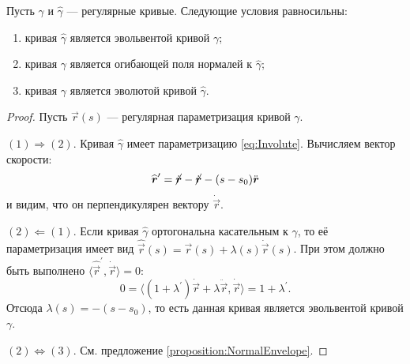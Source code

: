 \begin{theorem}
	Пусть $\gamma$ и $\widehat{\gamma}$ --- регулярные кривые. Следующие условия равносильны:
	\begin{enumerate}[nolistsep, label=(\arabic*)]
		\item кривая $\widehat{\gamma}$ является эвольвентой кривой $\gamma$;
		\item кривая $\gamma$ является огибающей поля нормалей к $\widehat{\gamma}$;
		\item кривая $\gamma$ является эволютой кривой $\widehat{\gamma}$.
	\end{enumerate}
\end{theorem}

\begin{proof}
	Пусть $\vec{r}(s)$ --- регулярная параметризация кривой $\gamma$.

	$(1) \Rightarrow (2)$. Кривая $\widehat{\gamma}$ имеет параметризацию \eqref{eq:Involute}. Вычисляем вектор скорости:
	\[
		\widehat{\vec{r}}^\prime = \cancel{\dot{\vec{r}}} - \cancel{\dot{\vec{r}}} - (s - s_0)\ddot{\vec{r}}
	\]
	и видим, что он перпендикулярен вектору $\dot{\vec{r}}$.

	$(2) \Leftarrow (1)$. Если кривая $\widehat{\gamma}$ ортогональна касательным к $\gamma$, то её параметризация имеет вид $\widehat{\vec{r}}(s) = \vec{r}(s) + \lambda(s)\dot{\vec{r}}(s)$. При этом должно быть выполнено $\langle\widehat{\vec{r}}^\prime, \dot{\vec{r}}\rangle = 0$:
	\[
		0 = \langle (1 + \lambda^\prime)\dot{\vec{r}} + \lambda\ddot{\vec{r}}, \dot{\vec{r}}\rangle = 1 + \lambda^\prime.
	\]
	Отсюда $\lambda(s) = -(s - s_0)$, то есть данная кривая является эвольвентой кривой $\gamma$.

	$(2) \Leftrightarrow (3)$. См. предложение \ref{proposition:NormalEnvelope}.
\end{proof}

